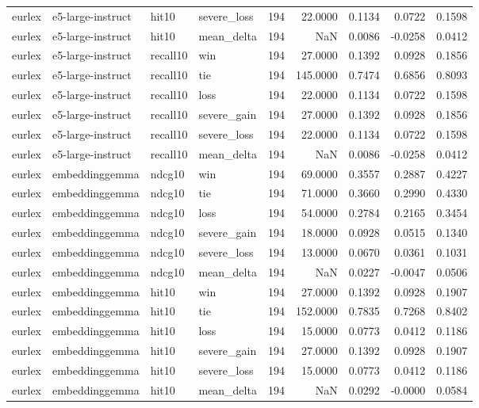 \begin{tabular}{llllrrrrr}
eurlex & e5-large-instruct & hit10 & severe\_loss & 194 & 22.0000 & 0.1134 & 0.0722 & 0.1598 \\
eurlex & e5-large-instruct & hit10 & mean\_delta & 194 & NaN & 0.0086 & -0.0258 & 0.0412 \\
eurlex & e5-large-instruct & recall10 & win & 194 & 27.0000 & 0.1392 & 0.0928 & 0.1856 \\
eurlex & e5-large-instruct & recall10 & tie & 194 & 145.0000 & 0.7474 & 0.6856 & 0.8093 \\
eurlex & e5-large-instruct & recall10 & loss & 194 & 22.0000 & 0.1134 & 0.0722 & 0.1598 \\
eurlex & e5-large-instruct & recall10 & severe\_gain & 194 & 27.0000 & 0.1392 & 0.0928 & 0.1856 \\
eurlex & e5-large-instruct & recall10 & severe\_loss & 194 & 22.0000 & 0.1134 & 0.0722 & 0.1598 \\
eurlex & e5-large-instruct & recall10 & mean\_delta & 194 & NaN & 0.0086 & -0.0258 & 0.0412 \\
eurlex & embeddinggemma & ndcg10 & win & 194 & 69.0000 & 0.3557 & 0.2887 & 0.4227 \\
eurlex & embeddinggemma & ndcg10 & tie & 194 & 71.0000 & 0.3660 & 0.2990 & 0.4330 \\
eurlex & embeddinggemma & ndcg10 & loss & 194 & 54.0000 & 0.2784 & 0.2165 & 0.3454 \\
eurlex & embeddinggemma & ndcg10 & severe\_gain & 194 & 18.0000 & 0.0928 & 0.0515 & 0.1340 \\
eurlex & embeddinggemma & ndcg10 & severe\_loss & 194 & 13.0000 & 0.0670 & 0.0361 & 0.1031 \\
eurlex & embeddinggemma & ndcg10 & mean\_delta & 194 & NaN & 0.0227 & -0.0047 & 0.0506 \\
eurlex & embeddinggemma & hit10 & win & 194 & 27.0000 & 0.1392 & 0.0928 & 0.1907 \\
eurlex & embeddinggemma & hit10 & tie & 194 & 152.0000 & 0.7835 & 0.7268 & 0.8402 \\
eurlex & embeddinggemma & hit10 & loss & 194 & 15.0000 & 0.0773 & 0.0412 & 0.1186 \\
eurlex & embeddinggemma & hit10 & severe\_gain & 194 & 27.0000 & 0.1392 & 0.0928 & 0.1907 \\
eurlex & embeddinggemma & hit10 & severe\_loss & 194 & 15.0000 & 0.0773 & 0.0412 & 0.1186 \\
eurlex & embeddinggemma & hit10 & mean\_delta & 194 & NaN & 0.0292 & -0.0000 & 0.0584 \\

\end{tabular}
